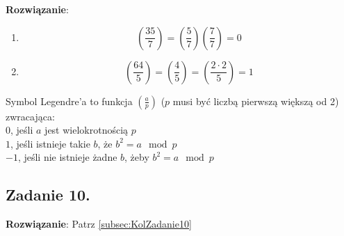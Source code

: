 \documentclass[a4paper,10pt, twocolumn]{article}
\begin{document}
\textbf{Rozwiązanie}:
\begin{enumerate}
 \item{
  \begin{equation*}
   (\frac{35}{7})=(\frac{5}{7})(\frac{7}{7})=0
  \end{equation*}
 }
 \item{
  \begin{equation*}
   (\frac{64}{5})=(\frac{4}{5})=(\frac{2\cdot 2}{5})=1
  \end{equation*}
 }
\end{enumerate}

Symbol Legendre'a to funkcja $\left( \frac a p \right)$ ($p$ musi być liczbą pierwszą większą od 2) zwracająca:
\\$0$, jeśli $a$ jest wielokrotnością $p$
\\$1$, jeśli istnieje takie $b$, że $b^2=a \mod p$
\\$-1$, jeśli nie istnieje żadne $b$, żeby $b^2=a \mod p$

\subsection{Zadanie 10.}
\textbf{Rozwiązanie}: Patrz \ref{subsec:KolZadanie10}
\end{document}
